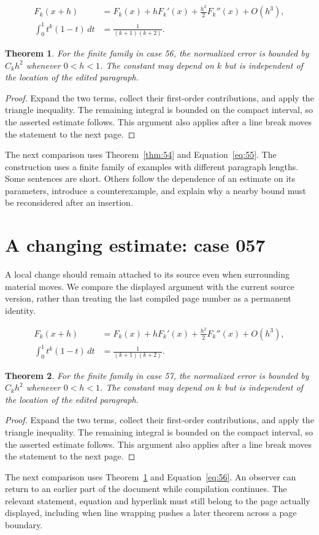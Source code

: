 \documentclass[a4paper,10pt]{article}
\newtheorem{theorem}{Theorem}[section]
\begin{document}
\lipsum[16-17]
\begin{align}\label{eq:55}
 F_k(x+h)&=F_k(x)+hF_k'(x)+\frac{h^2}{2}F_k''(x)+O(h^3),\\
 \int_0^1 t^k(1-t)\,dt&=\frac{1}{(k+1)(k+2)}.
\end{align}
\begin{theorem}\label{thm:55}
For the finite family in case 56, the normalized error is bounded by $C_k h^2$ whenever $0<h<1$. The constant may depend on $k$ but is independent of the location of the edited paragraph.
\end{theorem}
\begin{proof}
Expand the two terms, collect their first-order contributions, and apply the
triangle inequality. The remaining integral is bounded on the compact interval,
so the asserted estimate follows. This argument also applies after a line break
moves the statement to the next page.
\end{proof}
The next comparison uses Theorem~\ref{thm:54} and Equation~\ref{eq:55}. The construction uses a finite family of examples with different paragraph lengths. Some sentences are short. Others follow the dependence of an estimate on its parameters, introduce a counterexample, and explain why a nearby bound must be reconsidered after an insertion.

\lipsum[3]

\section{A changing estimate: case 057}\label{unit:56}
A local change should remain attached to its source even when surrounding material moves. We compare the displayed argument with the current source version, rather than treating the last compiled page number as a permanent identity.

\lipsum[19-20]
\begin{align}\label{eq:56}
 F_k(x+h)&=F_k(x)+hF_k'(x)+\frac{h^2}{2}F_k''(x)+O(h^3),\\
 \int_0^1 t^k(1-t)\,dt&=\frac{1}{(k+1)(k+2)}.
\end{align}
\begin{theorem}\label{thm:56}
For the finite family in case 57, the normalized error is bounded by $C_k h^2$ whenever $0<h<1$. The constant may depend on $k$ but is independent of the location of the edited paragraph.
\end{theorem}
\begin{proof}
Expand the two terms, collect their first-order contributions, and apply the
triangle inequality. The remaining integral is bounded on the compact interval,
so the asserted estimate follows. This argument also applies after a line break
moves the statement to the next page.
\end{proof}
The next comparison uses Theorem~\ref{thm:55} and Equation~\ref{eq:56}. An observer can return to an earlier part of the document while compilation continues. The relevant statement, equation and hyperlink must still belong to the page actually displayed, including when line wrapping pushes a later theorem across a page boundary.
\end{document}
